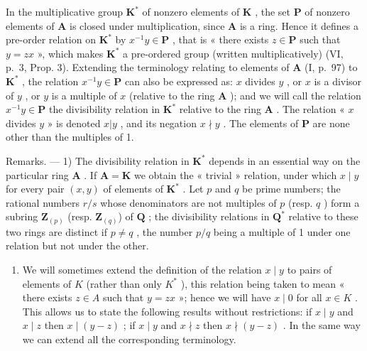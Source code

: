 In the multiplicative group \(\mathbf{K}^*\) of nonzero elements of \(\mathbf{K}\) , the set \(\mathbf{P}\) of nonzero elements of \(\mathbf{A}\) is closed under multiplication, since \(\mathbf{A}\) is a ring. Hence it defines a pre-order relation on \(\mathbf{K}^*\) by \(x^{-1}y\in \mathbf{P}\) , that is « there exists \(z\in \mathbf{P}\) such that \(y = zx\) », which makes \(\mathbf{K}^*\) a pre-ordered group (written multiplicatively) (VI, p.~3, Prop. 3). Extending the terminology relating to elements of \(\mathbf{A}\) (I, p.~97) to \(\mathbf{K}^*\) , the relation \(x^{-1}y\in \mathbf{P}\) can also be expressed as: \(x\) divides \(y\) , or \(x\) is a divisor of \(y\) , or \(y\) is a multiple of \(x\) (relative to the ring \(\mathbf{A}\) ); and we will call the relation \(x^{-1}y\in \mathbf{P}\) the divisibility relation in \(\mathbf{K}^*\) relative to the ring \(\mathbf{A}\) . The relation « \(x\) divides \(y\) » is denoted \(x|y\) , and its negation \(x\nmid y\) . The elements of \(\mathbf{P}\) are none other than the multiples of 1.

Remarks. --- 1) The divisibility relation in \(\mathbf{K}^*\) depends in an essential way on the particular ring \(\mathbf{A}\) . If \(\mathbf{A} = \mathbf{K}\) we obtain the « trivial » relation, under which \(x \mid y\) for every pair \((x, y)\) of elements of \(\mathbf{K}^*\) . Let \(p\) and \(q\) be prime numbers; the rational numbers \(r/s\) whose denominators are not multiples of \(p\) (resp. \(q\) ) form a subring \(\mathbf{Z}_{(p)}\) (resp. \(\mathbf{Z}_{(q)}\)) of \(\mathbf{Q}\) ; the divisibility relations in \(\mathbf{Q}^*\) relative to these two rings are distinct if \(p \neq q\) , the number \(p/q\) being a multiple of 1 under one relation but not under the other.

\begin{enumerate}
\def\labelenumi{\arabic{enumi})}
\setcounter{enumi}{1}
\tightlist
\item
  We will sometimes extend the definition of the relation \(x \mid y\) to pairs of elements of \(K\) (rather than only \(K^*\) ), this relation being taken to mean « there exists \(z \in A\) such that \(y = zx\) »; hence we will have \(x \mid 0\) for all \(x \in K\) . This allows us to state the following results without restrictions: if \(x \mid y\) and \(x \mid z\) then \(x \mid (y - z)\) ; if \(x \mid y\) and \(x \nmid z\) then \(x \nmid (y - z)\) . In the same way we can extend all the corresponding terminology.
\end{enumerate}

